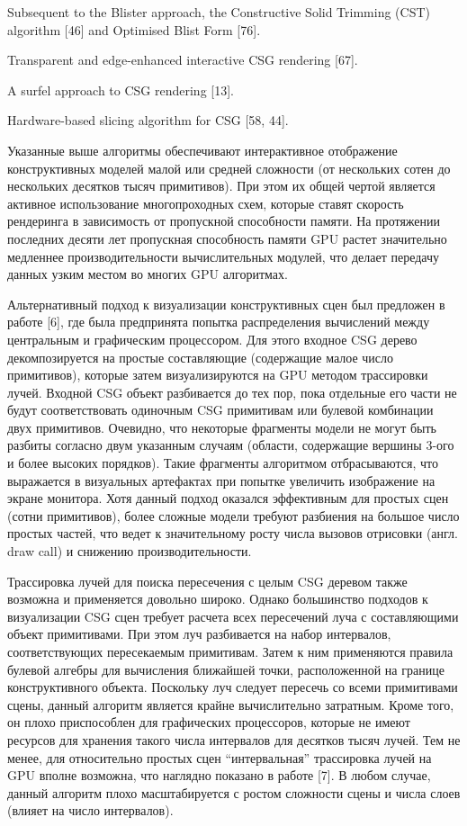 {{{{Subsequent to the Blister approach, the Constructive Solid Trimming (CST) algorithm [46] and Optimised Blist Form [76].

Transparent and edge-enhanced interactive CSG rendering [67].

A surfel approach to CSG rendering [13].

Hardware-based slicing algorithm for CSG [58, 44].

Указанные выше алгоритмы обеспечивают интерактивное отображение конструктивных моделей малой или средней  сложности (от нескольких сотен до нескольких десятков тысяч примитивов). При этом их общей чертой является активное использование многопроходных схем, которые ставят скорость рендеринга в зависимость от пропускной способности памяти. На протяжении последних десяти лет пропускная способность памяти GPU растет значительно медленнее производительности вычислительных модулей,  что делает передачу данных узким местом во многих GPU алгоритмах.

Альтернативный подход к визуализации конструктивных сцен был предложен в работе [6], где была предпринята попытка распределения вычислений между центральным и графическим процессором. Для этого входное CSG дерево декомпозируется на простые составляющие (содержащие малое число примитивов), которые затем визуализируются на GPU методом трассировки лучей. Входной CSG объект разбивается до тех пор, пока отдельные его части не будут соответствовать одиночным CSG примитивам или булевой  комбинации двух примитивов. Очевидно, что некоторые фрагменты модели не могут быть разбиты согласно двум указанным случаям (области, содержащие вершины 3-ого и более высоких порядков). Такие фрагменты алгоритмом отбрасываются, что выражается в визуальных артефактах при попытке увеличить изображение на экране монитора. Хотя данный подход оказался эффективным для простых сцен (сотни примитивов), более сложные модели требуют разбиения на большое число простых частей, что ведет к значительному росту числа вызовов отрисовки (англ. draw call) и снижению производительности.

Трассировка лучей для поиска пересечения с целым CSG деревом также возможна и применяется довольно широко. Однако большинство подходов к визуализации CSG сцен требует расчета всех пересечений луча с составляющими объект примитивами. При этом луч разбивается на набор интервалов, соответствующих пересекаемым примитивам. Затем к ним применяются правила булевой алгебры для вычисления ближайшей точки, расположенной на границе конструктивного объекта. Поскольку луч следует пересечь со всеми примитивами сцены, данный алгоритм является крайне вычислительно затратным. Кроме того, он плохо приспособлен для графических процессоров, которые не имеют ресурсов для хранения такого числа интервалов для десятков тысяч лучей. Тем не менее, для относительно простых сцен “интервальная” трассировка лучей на GPU вполне возможна, что наглядно показано в работе [7]. В любом случае, данный алгоритм плохо масштабируется с ростом сложности сцены и числа слоев (влияет на число интервалов).

}}}}
